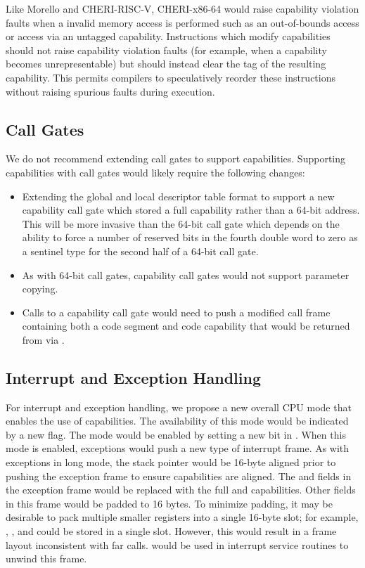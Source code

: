 Like Morello and CHERI-RISC-V, CHERI-x86-64 would
raise capability violation faults when a invalid memory access is
performed such as an out-of-bounds access or access via an untagged
capability.  Instructions which modify
capabilities should not raise capability violation faults (for
example, when a capability becomes unrepresentable) but should instead
clear the tag of the resulting capability.  This permits compilers to
speculatively reorder these instructions without raising spurious
faults during execution.

\subsection{Call Gates}

We do not recommend extending call gates to support capabilities.
Supporting capabilities with call gates would likely require the
following changes:

\begin{itemize}
  \item Extending the global and local descriptor table format to
    support a new capability call gate which stored a full capability
    rather than a 64-bit address.  This will be more invasive than the
    64-bit call gate which depends on the ability to force a number
    of reserved bits in the fourth double word to zero as a sentinel
    type for the second half of a 64-bit call gate.

  \item As with 64-bit call gates, capability call gates would not support
    parameter copying.

  \item Calls to a capability call gate would need to push a modified
    call frame containing both a code segment and code capability that
    would be returned from via .
\end{itemize}

\subsection{Interrupt and Exception Handling}
\label{sec:x86:interrupt-exception}

For interrupt and exception handling, we propose a new overall CPU
mode that enables the use of capabilities.  The availability of this
mode would be indicated by a new  flag.  The mode
would be enabled by setting a new bit in \CRFOUR{}.  When this mode is
enabled, exceptions would push a new type of interrupt frame.  As with
exceptions in long mode, the stack pointer would be 16-byte aligned
prior to pushing the exception frame to ensure capabilities are
aligned.  The \RIP{} and \RSP{} fields in the exception frame would be
replaced with the full \CIP{} and \CSP{} capabilities.  Other fields
in this frame would be padded to 16 bytes.  To minimize padding, it
may be desirable to pack multiple smaller registers into a single
16-byte slot; for example, \SSreg{}, \CS{}, and \RFLAGS{} could be stored
in a single slot.  However, this would result in a frame layout
inconsistent with far calls.   would be used in
interrupt service routines to unwind this frame.

